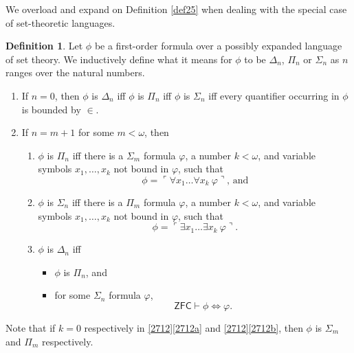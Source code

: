 \documentclass[12pt, twoside]{memoir}
\numberwithin{equation}{section}
\theoremstyle{definition}
\newtheorem{defi}[thm]{Definition}
\theoremstyle{remark}
\theoremstyle{definition}
\theoremstyle{definition}
\theoremstyle{definition}
\theoremstyle{remark}
\begin{document}
We overload and expand on Definition \ref{def25} when dealing with the special case of set-theoretic languages. 

\begin{defi}\label{def27}
Let $\phi$ be a first-order formula over a possibly expanded language of set theory. We inductively define what it means for $\phi$ to be $\Delta_n$, $\Pi_n$ or $\Sigma_n$ as $n$ ranges over the natural numbers.
\begin{enumerate}[label=(\arabic*)]
    \item\label{def271} If $n = 0$, then $\phi$ is $\Delta_n$ iff $\phi$ is $\Pi_n$ iff $\phi$ is $\Sigma_n$ iff every quantifier occurring in $\phi$ is bounded by $\in$.
    \item\label{2712} If $n = m + 1$ for some $m < \omega$, then 
    \begin{enumerate}[label=(\alph*)]
        \item\label{2712a} $\phi$ is $\Pi_n$ iff there is a $\Sigma_m$ formula $\varphi$, a number $k < \omega$, and variable symbols $x_1, \dots, x_k$ not bound in $\varphi$, such that 
        \begin{equation*}
            \phi = \ulcorner \forall x_1 \dots \forall x_k \ \varphi \urcorner \text{, and}
        \end{equation*}
        \item\label{2712b} $\phi$ is $\Sigma_n$ iff there is a $\Pi_m$ formula $\varphi$, a number $k < \omega$, and variable symbols $x_1, \dots, x_k$ not bound in $\varphi$, such that 
        \begin{equation*}
            \phi = \ulcorner \exists x_1 \dots \exists x_k \ \varphi \urcorner \text{.}
        \end{equation*}
        \item $\phi$ is $\Delta_n$ iff 
        \begin{itemize}[label=$\circ$]
            \item $\phi$ is $\Pi_n$, and
            \item for some $\Sigma_n$ formula $\varphi$,
            \begin{equation*}
                \mathsf{ZFC} \vdash \phi \iff \varphi \text{.}
            \end{equation*}
        \end{itemize}
    \end{enumerate}
\end{enumerate}
Note that if $k = 0$ respectively in \ref{2712}\ref{2712a} and \ref{2712}\ref{2712b}, then $\phi$ is $\Sigma_m$ and $\Pi_m$ respectively.
\end{defi}
\end{document}
